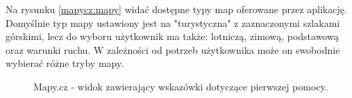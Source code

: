 Na rysunku \ref{mapycz:mapy} widać dostępne typy map oferowane przez aplikację. Domyślnie typ mapy ustawiony jest na "turystyczna" z zaznaczonymi szlakami górskimi, lecz do wyboru użytkownik ma także: lotniczą, zimową, podstawową oraz warunki ruchu. W zależności od potrzeb użytkownika może on swobodnie wybierać różne tryby mapy. 
\\
\begin{figure}[H]
    \centering
    \caption{Mapy.cz - widok zawierający wskazówki dotyczące pierwszej pomocy.}
    \label{mapycz:pomoc}
\end{figure}
